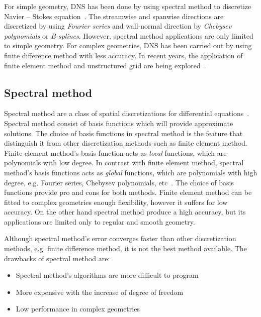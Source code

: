 For simple geometry, DNS has been done by using spectral method to discretize Navier -- Stokes equation~\cite{chung}. The streamwise and spanwise directions are discretized by using \emph{Fourier series} and wall-normal direction by \emph{Chebysev polynomials} or \emph{B-splines}. However, spectral method applications are only limited to simple geometry. For complex geometries, DNS has been carried out by using finite difference method with less accuracy. In recent years, the application of finite element method and unstructured grid are being explored~\cite{parviz}.

\subsection{Spectral method}
Spectral method are a class of spatial discretizations for differential equations~\cite{canuto}. Spectral method consist of basis functions which will provide approximate solutions. The choice of basis functions in spectral method is the feature that distinguish it from other discretization methods such as finite element method.  Finite element method's basis function acts as \emph{local} functions, which are polynomials with low degree. In contrast with finite element method, spectral method's basis functions acts as \emph{global} functions, which are polynomials with high degree, e.g. Fourier series, Chebysev polynomials, etc~\cite{boyd}. The choice of basis functions provide pro and cons for both methods. Finite element method can be fitted to complex geometries enough flexibility, however it suffers for low accuracy. On the other hand spectral method produce a high accuracy, but its applications are limited only to regular and smooth geometry.

Although spectral method's error converges faster than other discretization methods, e.g. finite difference method, it is not the best method available. The drawbacks of spectral method are:
\begin{itemize}
\item Spectral method's algorithms are more difficult to program
\item More expensive with the increase of degree of freedom 
\item Low performance in complex geometries
\end{itemize}
 

